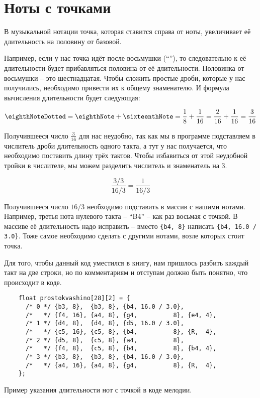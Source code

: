 \documentclass[../sparc.tex]{subfiles}
\begin{document}
\section{Ноты с точками}
\label{section:dotted-notes}

В музыкальной нотации точка, которая ставится справа от ноты, увеличивает её
длительность на половину от базовой.

Например, если у нас точка идёт после восьмушки (``\eighthNoteDotted''), то
следовательно к её длительности будет прибавляться половина от её длительности.
Половинка от восьмушки -- это шестнадцатая. Чтобы сложить простые дроби, которые
у нас получились, необходимо привести их к общему знаменателю. И формула
вычисления длительности будет следующая:

\begin{equation}
  \mbox{\eighthNoteDotted} = \mbox{\eighthNote} + \mbox{\sixteenthNote}
  = \frac{1}{8} + \frac{1}{16} = \frac{2}{16} + \frac{1}{16} = \frac{3}{16}
\end{equation}

Получившееся число $\frac{3}{16}$ для нас неудобно, так как мы в программе
подставляем в числитель дроби длительность одного такта, а тут у нас получается,
что необходимо поставить длину трёх тактов. Чтобы избавиться от этой неудобной
тройки в числителе, мы можем разделить числитель и знаменатель на 3.

\begin{equation}
  \frac{3 / 3}{16 / 3} = \frac{1}{16 / 3}
\end{equation}

Получившееся число $16 / 3$ необходимо подставить в массив с нашими нотами.
Например, третья нота нулевого такта -- ``B4'' -- как раз восьмая с точкой. В
массиве её длительность надо исправить -- вместо \texttt{\{b4, 8\}} написать
\texttt{\{b4, 16.0 / 3.0\}}. Тоже самое необходимо сделать с другими нотами,
возле которых стоит точка.

Для того, чтобы данный код уместился в книгу, нам пришлось разбить каждый такт
на две строки, но по комментариям и отступам должно быть понятно, что происходит
в коде.

\begin{listing}[ht]
  \begin{verbatim}
    float prostokvashino[28][2] = {
      /* 0 */ {b3, 8},  {b3, 8}, {b4, 16.0 / 3.0},
      /*   */ {f4, 16}, {a4, 8}, {g4,          8}, {e4, 4},
      /* 1 */ {d4, 8},  {d4, 8}, {d5, 16.0 / 3.0},
      /*   */ {c5, 16}, {c5, 8}, {b4,          8}, {R,  4},
      /* 2 */ {d5, 8},  {c5, 8}, {a4,          8},
      /*   */ {f4, 8},  {c5, 8}, {b4,          8}, {b4, 4},
      /* 3 */ {b3, 8},  {b3, 8}, {b4, 16.0 / 3.0},
      /*   */ {a4, 16}, {a4, 8}, {g4,          8}, {R,  4},
    };
  \end{verbatim}
  \label{listing:music-dotted-notes}
  \caption{Пример указания длительности нот с точкой в коде мелодии.}
\end{listing}
\end{document}
